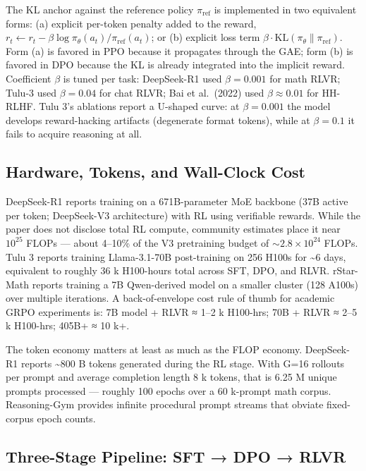 \documentclass{article}
\begin{document}
The KL anchor against the reference policy \(\pi_{\mathrm{ref}}\) is implemented in two equivalent forms: (a) explicit per-token penalty added to the reward, \(r_t \leftarrow r_t - \beta \log \pi_\theta(a_t)/\pi_{\mathrm{ref}}(a_t)\); or (b) explicit loss term \(\beta \cdot \mathrm{KL}(\pi_\theta \| \pi_{\mathrm{ref}})\). Form (a) is favored in PPO because it propagates through the GAE; form (b) is favored in DPO because the KL is already integrated into the implicit reward. Coefficient \(\beta\) is tuned per task: DeepSeek-R1 used \(\beta = 0.001\) for math RLVR; Tulu-3 used \(\beta = 0.04\) for chat RLVR; Bai et al.~(2022) used \(\beta \approx 0.01\) for HH-RLHF. Tulu 3's ablations report a U-shaped curve: at \(\beta = 0.001\) the model develops reward-hacking artifacts (degenerate format tokens), while at \(\beta = 0.1\) it fails to acquire reasoning at all.

\subsection{Hardware, Tokens, and Wall-Clock Cost}\label{hardware-tokens-and-wall-clock-cost}

DeepSeek-R1 reports training on a 671B-parameter MoE backbone (37B active per token; DeepSeek-V3 architecture) with RL using verifiable rewards. While the paper does not disclose total RL compute, community estimates place it near \(10^{25}\) FLOPs --- about 4--10\% of the V3 pretraining budget of \(\sim 2.8 \times 10^{24}\) FLOPs. Tulu 3 \citep{lambert20242024} reports training Llama-3.1-70B post-training on 256 H100s for \textasciitilde6 days, equivalent to roughly 36 k H100-hours total across SFT, DPO, and RLVR. rStar-Math \citep{guan20252025} reports training a 7B Qwen-derived model on a smaller cluster (128 A100s) over multiple iterations. A back-of-envelope cost rule of thumb for academic GRPO experiments is: 7B model + RLVR ≈ 1--2 k H100-hrs; 70B + RLVR ≈ 2--5 k H100-hrs; 405B+ ≈ 10 k+.

The token economy matters at least as much as the FLOP economy. DeepSeek-R1 reports \textasciitilde800 B tokens generated during the RL stage. With G=16 rollouts per prompt and average completion length 8 k tokens, that is 6.25 M unique prompts processed --- roughly 100 epochs over a 60 k-prompt math corpus. Reasoning-Gym \citep{stojanovski20252025} provides infinite procedural prompt streams that obviate fixed-corpus epoch counts.

\subsection{Three-Stage Pipeline: SFT → DPO → RLVR}\label{three-stage-pipeline-sft-dpo-rlvr}
\end{document}
